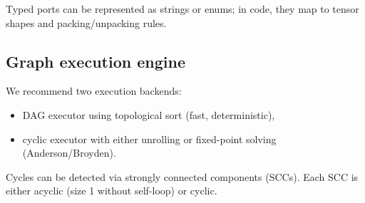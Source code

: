 \documentclass[11pt]{article}
\theoremstyle{definition}
\theoremstyle{plain}
\theoremstyle{remark}
\begin{document}
Typed ports can be represented as strings or enums; in code, they map to tensor shapes and packing/unpacking rules.

\subsection{Graph execution engine}
We recommend two execution backends:
\begin{itemize}[leftmargin=2em]
\item DAG executor using topological sort (fast, deterministic),
\item cyclic executor with either unrolling or fixed-point solving (Anderson/Broyden).
\end{itemize}
Cycles can be detected via strongly connected components (SCCs).
Each SCC is either acyclic (size 1 without self-loop) or cyclic.
\end{document}
